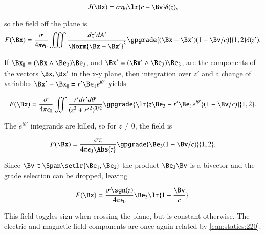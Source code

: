 \begin{dmath}\label{eqn:statics:240}
J(\Bx) = \sigma \eta_0 \lr{ c - \Bv } \delta(z),
\end{dmath}

so the field off the plane is
\begin{dmath}\label{eqn:statics:260}
F(\Bx)
=
\frac{\sigma}{4 \pi \epsilon_0 } \iiint \frac{dz' dA'}{ \Norm{ \Bx - \Bx' }^3 }
\gpgrade{ (\Bx - \Bx') (1 - \Bv/c) }{1,2} \delta(z').
\end{dmath}

If \( \Bx_\parallel = (\Bx \wedge \Be_3) \Be_3 \), and \( \Bx'_\parallel = (\Bx' \wedge \Be_3) \Be_3 \), are the components of the vectors \( \Bx, \Bx' \) in the x-y plane, then integration over \( z' \) and a change of variables \( \Bx'_\parallel - \Bx_\parallel = r' \Be_1 e^{i \theta'} \) yields

\begin{dmath}\label{eqn:statics:280}
F(\Bx)
=
\frac{\sigma}{4 \pi \epsilon_0 } \iint \frac{r' dr' d\theta'}{ ( z^2 + {r'}^2 )^{3/2} }
\gpgrade{ \lr{ z \Be_3 - r' \Be_1 e^{i\theta'} } (1 - \Bv/c) }{1,2}.
\end{dmath}

The \( e^{i\theta'} \) integrands are killed, so for \( z \ne 0 \), the field is

\begin{dmath}\label{eqn:statics:300}
F(\Bx)
=
\frac{\sigma z}{4 \pi \epsilon_0 \Abs{z} } \gpgrade{ \Be_3 (1 - \Bv/c) }{1,2}.
\end{dmath}

Since \( \Bv \in \Span \setlr{ \Be_1, \Be_2 } \) the product \( \Be_3 \Bv \) is a bivector and the grade selection can be dropped, leaving

\begin{dmath}\label{eqn:statics:320}
F(\Bx)
=
\frac{\sigma \sgn(z)}{4 \pi \epsilon_0 } \Be_3 \lr{ 1 - \frac{\Bv}{c}}.
\end{dmath}

This field toggles sign when crossing the plane, but is constant otherwise.  The electric and magnetic field components are once again related by \cref{eqn:statics:220}.

